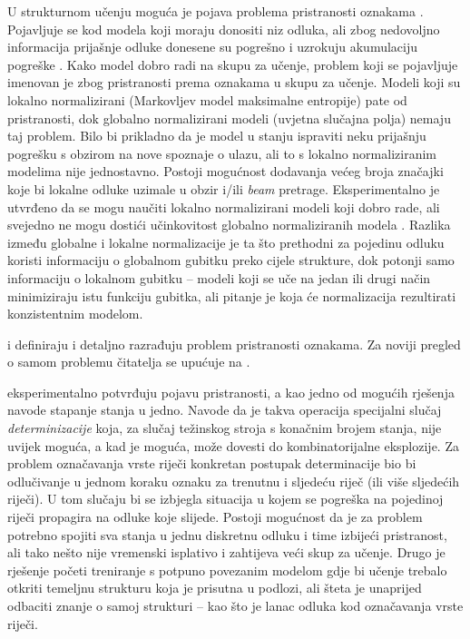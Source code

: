 U strukturnom učenju moguća je pojava problema pristranosti oznakama . Pojavljuje se kod modela koji moraju donositi niz odluka, ali zbog
nedovoljno informacija prijašnje odluke donesene su pogrešno i uzrokuju akumulaciju
pogreške . Kako model dobro radi na skupu za učenje,
problem koji se pojavljuje imenovan je zbog pristranosti prema oznakama u skupu
za učenje. Modeli koji su lokalno normalizirani (Markovljev model maksimalne
entropije) pate od pristranosti, dok globalno normalizirani modeli (uvjetna
slučajna polja) nemaju taj problem. Bilo bi prikladno da je model u stanju
ispraviti neku prijašnju pogrešku s obzirom na nove spoznaje o ulazu, ali to s
lokalno normaliziranim modelima nije jednostavno. Postoji mogućnost dodavanja
većeg broja značajki koje bi lokalne odluke uzimale u obzir i/ili \textit{beam}
pretrage. Eksperimentalno je utvrđeno da se mogu naučiti lokalno normalizirani
modeli koji dobro rade, ali svejedno ne mogu dostići učinkovitost globalno
normaliziranih modela \citep{liang2008structure}. Razlika između globalne i
lokalne normalizacije je ta što prethodni za pojedinu odluku koristi informaciju
o globalnom gubitku preko cijele strukture, dok potonji samo informaciju o
lokalnom gubitku -- modeli koji se uče na jedan ili drugi način minimiziraju
istu funkciju gubitka, ali pitanje je koja će normalizacija rezultirati
konzistentnim modelom.

\citet*{lafferty2001conditional} i \citet*{leon1991approche} definiraju i
detaljno razrađuju problem pristranosti oznakama. Za noviji pregled o samom
problemu čitatelja se upućuje na \citep{andor2016globally}.

\citet*{lafferty2001conditional} eksperimentalno potvrđuju pojavu pristranosti,
a kao jedno od mogućih rješenja navode stapanje stanja u jedno. Navode da je
takva operacija specijalni slučaj \emph{determinizacije} koja, za slučaj
težinskog stroja s konačnim brojem stanja, nije uvijek moguća, a kad je moguća,
može dovesti do kombinatorijalne eksplozije. Za problem označavanja vrste riječi
konkretan postupak determinacije bio bi odlučivanje u jednom koraku oznaku za
trenutnu i sljedeću riječ (ili više sljedećih riječi). U tom slučaju bi se
izbjegla situacija u kojem se pogreška na pojedinoj riječi propagira na odluke
koje slijede. Postoji mogućnost da je za problem potrebno spojiti sva stanja u
jednu diskretnu odluku i time izbijeći pristranost, ali tako nešto nije
vremenski isplativo i zahtijeva veći skup za učenje. Drugo je rješenje početi
treniranje s potpuno povezanim modelom gdje bi učenje trebalo otkriti temeljnu
strukturu koja je prisutna u podlozi, ali šteta je unaprijed odbaciti znanje o
samoj strukturi -- kao što je lanac odluka kod označavanja vrste riječi.


